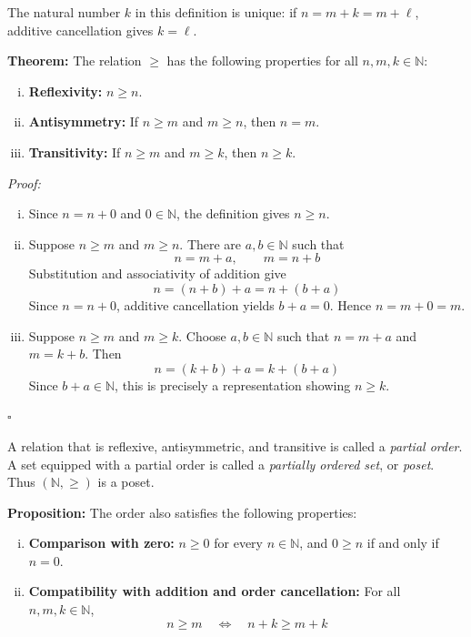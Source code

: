 \documentclass[a4paper,11pt,abstracton]{scrartcl}
\newcommand{\NN}{\mathbb{N}}
\theoremstyle{dotlessP}
\theoremstyle{dotlessS}
\theoremstyle{remark}
\theoremstyle{definition}
\begin{document}
The natural number $k$ in this definition is unique: if
$n=m+k=m+\ell$, additive cancellation gives $k=\ell$.

\begin{problem_box}
\textbf{Theorem:}
The relation $\ge$ has the following properties for all $n,m,k\in\NN$:
\begin{enumerate}[(i)]
    \item \textbf{Reflexivity:} $n\ge n$.
    \item \textbf{Antisymmetry:} If $n\ge m$ and $m\ge n$, then $n=m$.
    \item \textbf{Transitivity:} If $n\ge m$ and $m\ge k$, then $n\ge k$.
\end{enumerate}
\end{problem_box}

\begin{claim_box}
\textit{Proof:}
\begin{enumerate}[(i)]
    \item Since $n=n+0$ and $0\in\NN$, the definition gives $n\ge n$.

    \item Suppose $n\ge m$ and $m\ge n$. There are $a,b\in\NN$ such that
    \[
        n=m+a,\qquad m=n+b
    \]
    Substitution and associativity of addition give
    \[
        n=(n+b)+a=n+(b+a)
    \]
    Since $n=n+0$, additive cancellation yields $b+a=0$.
    Hence $n=m+0=m$.

    \item Suppose $n\ge m$ and $m\ge k$. Choose $a,b\in\NN$ such that
    $n=m+a$ and $m=k+b$. Then
    \[
        n=(k+b)+a=k+(b+a)
    \]
    Since $b+a\in\NN$, this is precisely a representation showing
    $n\ge k$.
\end{enumerate}
\hfill$\square$
\end{claim_box}

A relation that is reflexive, antisymmetric, and transitive is called a
\emph{partial order}. A set equipped with a partial order is called a
\emph{partially ordered set}, or \emph{poset}. Thus $(\NN,\ge)$ is a poset.

\begin{problem_box}
\textbf{Proposition:}
The order also satisfies the following properties:
\begin{enumerate}[(i)]
    \item \textbf{Comparison with zero:} $n\ge0$ for every $n\in\NN$, and
    $0\ge n$ if and only if $n=0$.
    \item \textbf{Compatibility with addition and order cancellation:}
    For all $n,m,k\in\NN$,
    \[
        n\ge m\quad\Longleftrightarrow\quad n+k\ge m+k
    \]
\end{enumerate}
\end{problem_box}
\end{document}
